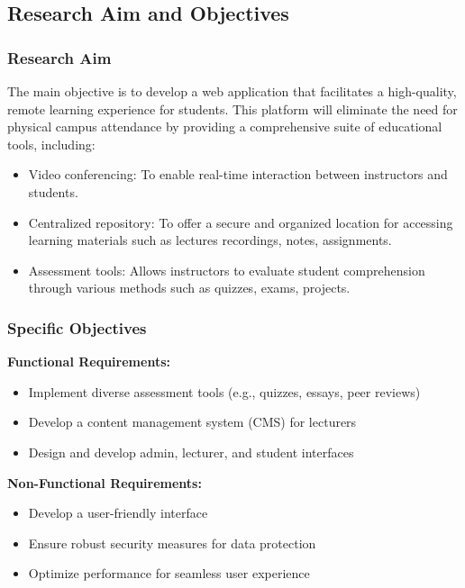 \documentclass[a4paper,12pt]{article}  %
\begin{document}
\subsection{Research Aim and Objectives}
\subsubsection{Research Aim}
The main objective is to develop a web application that facilitates a
high-quality, remote learning experience for students. This platform will
eliminate the need for physical campus attendance by providing a comprehensive
suite of educational tools, including:\\

\begin{itemize}
  \item Video conferencing: To enable real-time interaction between instructors and
        students.\\
  \item Centralized repository: To offer a secure and organized location for accessing
        learning materials such as lectures recordings, notes, assignments.\\
  \item Assessment tools: Allows instructors to evaluate student comprehension through
        various methods such as quizzes, exams, projects.\\
\end{itemize}

\subsubsection{Specific Objectives}
\textbf{Functional Requirements:}
\begin{itemize}
  \item Implement diverse assessment tools (e.g., quizzes, essays, peer reviews)\\
  \item Develop a content management system (CMS) for lecturers\\
  \item Design and develop admin, lecturer, and student interfaces\\
\end{itemize}

\textbf{Non-Functional Requirements:}
\begin{itemize}
  \item Develop a user-friendly interface\\
  \item Ensure robust security measures for data protection\\
  \item Optimize performance for seamless user experience\\
\end{itemize}
\end{document}
